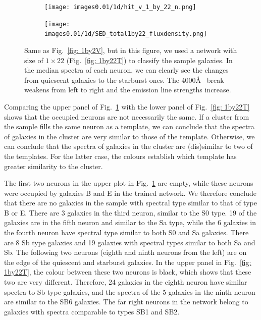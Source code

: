             \begin{figure}
                \begin{subfigure}[b]{\textwidth}
                    \texttt{[image: images0.01/1d/hit\_v\_1\_by\_22\_n.png]}
                    \centering
                \end{subfigure}
                \hfill
                \begin{subfigure}[b]{\textwidth}
                \centering
                     \texttt{[image: images0.01/1d/SED\_total1by22\_fluxdensity.png]}
                \end{subfigure}
                \caption[Classification of fitted galaxy SEDs from \citet{Hossein12} using the $1\times22$~networks]{Same as Fig.~\ref{fig: 1by2V}, but in this figure, we used a network with size of $1\times22$ (Fig.~\ref{fig: 1by22T}) to classify the sample galaxies. In the median spectra of each neuron, we can clearly see the changes from quiescent galaxies to the starburst ones. The 4000\AA~ break weakens from left to right and the emission line strengths increase.}
                \label{fig: 1by22V}
            \end{figure}
            
            Comparing the upper panel of Fig.~\ref{fig: 1by22V} with the lower panel of Fig.~\ref{fig: 1by22T} shows that the occupied neurons are not necessarily the same.
            If a cluster from the  sample fills the same neuron as a  template, we can conclude that the spectra of galaxies in the cluster are very similar to those of the template.
            Otherwise, we can conclude that the spectra of galaxies in the cluster are (dis)similar to two of the  templates.
            For the latter case, the colours establish which template has greater similarity to the  cluster.
            
            The first two neurons in the upper plot in Fig.~\ref{fig: 1by22V} are empty, while these neurons were occupied by galaxies B and E in the trained network.
            We therefore conclude that there are no galaxies in the  sample with spectral type similar to that of type B or E.
            There are 3 galaxies in the third neuron, similar to the S0 type. 
            19 of the galaxies are in the fifth neuron and similar to the Sa type, while the 6 galaxies in the fourth neuron have spectral type similar to both S0 and Sa galaxies.
            There are 8 Sb type galaxies and 19 galaxies with spectral types similar to both Sa and Sb.
            The following two neurons (eighth and ninth neurons from the left) are on the edge of the quiescent and starburst galaxies.
            In the upper panel in Fig.~\ref{fig: 1by22T}, the colour between these two neurons is black, which shows that these two are very different.
            Therefore, 24 galaxies in the eighth neuron have similar spectra to Sb type galaxies, and the spectra of the 5 galaxies in the ninth neuron are similar to the SB6 galaxies.
            The far right neurons in the network belong to galaxies with spectra comparable to types SB1 and SB2.
            
